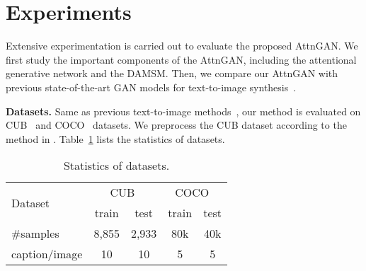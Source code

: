 \documentclass[10pt,twocolumn,letterpaper]{article}
\begin{document}
\section{Experiments}
\vspace{-5pt}
{
Extensive experimentation is carried out to evaluate the proposed AttnGAN. 
We first study the important components of the AttnGAN, including the attentional generative network and the DAMSM. 
Then, we compare our AttnGAN with previous state-of-the-art GAN models for text-to-image synthesis~\cite{Han16stackgan,Han17stackgan2,reed2016generative,reed2016learning,NguyenYBDC17}. 
}


\textbf{Datasets. }{
Same as previous text-to-image methods~\cite{Han16stackgan,Han17stackgan2,reed2016generative,reed2016learning}, our method is evaluated on CUB~\cite{WahCUB_200_2011} and COCO~\cite{LinMBHPRDZ14} datasets. 
We preprocess the CUB dataset according to the method in \cite{Han16stackgan}.  
Table~\ref{tab:dataset} lists the statistics of datasets. 
}

\begin{table}[bt]
  \begin{center}
  \small
   \begin{tabular}{|l|c|c|c|c|}
    \hline
     \multirow{2}{4em}{Dataset}&\multicolumn{2}{c|}{CUB~\cite{WahCUB_200_2011}} &\multicolumn{2}{c|}{COCO~\cite{LinMBHPRDZ14}} \\
    \cline{2-5}
     &train &test &train &test \\
    \hline
     \#samples&8,855 &2,933 &80k &40k \\
    \hline
     caption/image&10 &10 &5 &5 \\
    \hline
   \end{tabular}
  \end{center}
  \vspace{-5pt}
  \caption{Statistics of datasets.}
  \vspace{-10pt}
  \label{tab:dataset} 
 \end{table}
\end{document}
